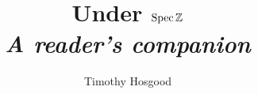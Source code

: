 



\title{Under $\operatorname{Spec}\mathbb{Z}$\\ \Large{\textit{A reader's companion}}}
\author{Timothy Hosgood}






    


    \pagestyle{pagenumbers}
    \setcounter{page}{1}
    
    
    

